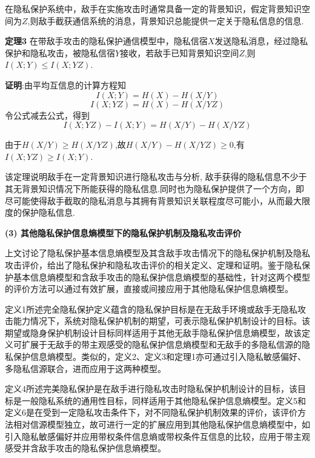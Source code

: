在隐私保护系统中，敌手在实施攻击时通常具备一定的背景知识，假定背景知识空间为$Z$,则敌手截获通信系统的消息，背景知识总能提供一定关于隐私信息的信息.

\textbf{定理3} 在带敌手攻击的隐私保护通信模型中，隐私信宿$X$发送隐私消息，经过隐私保护和隐私攻击，被隐私信宿$Y$接收，若敌手已知背景知识空间$Z$,则$I(X;Y)\leqslant I(X;YZ)$.

\textbf{证明}:由平均互信息的计算方程知
\begin{equation}
I(X;Y) =H(X)-H(X/Y)
\end{equation}
\begin{equation}
I(X;YZ) =H(X)-H(X/YZ)
\end{equation}
令公式减去公式，得到
\begin{equation}
I(X;YZ)-I(X;Y) =H(X/Y)-H(X/YZ)
\end{equation}

由于$H(X/Y) \geqslant H(X/YZ)$,故$H(X/Y)- H(X/YZ)\geqslant0$,有$I(X;YZ)\geqslant I(X;Y)$.

该定理说明敌手在一定背景知识进行隐私攻击与分析, 敌手获得的隐私信息不少于其无背景知识情况下所能获得的隐私信息.同时也为隐私保护提供了一个方向，即尽可能使得敌手截取的隐私消息与其拥有背景知识关联程度尽可能小，从而最大限度的保护隐私信息.

\textbf{(3) 其他隐私保护信息熵模型下的隐私保护机制及隐私攻击评价}

上文讨论了隐私保护基本信息熵模型及其含敌手攻击情况下的隐私保护机制及隐私攻击评价，给出了隐私保护和隐私攻击评价的相关定义、定理和证明。鉴于隐私保护基本信息熵模型和含敌手攻击的隐私保护信息熵模型的基础性，针对这两个模型的评价方法可以通过有效扩展，直接或间接应用于其他隐私保护信息熵模型。

定义1所述完全隐私保护定义蕴含的隐私保护目标是在无敌手环境或敌手无隐私攻击能力情况下，系统对隐私保护机制的期望，可表示隐私保护机制设计的目标。该期望或隐身保护机制设计目标同样适用于其他无敌手隐私保护信息熵模型，故该定义可扩展于无敌手的带主观感受的隐私保护信息熵模型和无敌手的多隐私信源的隐私保护信息熵模型。类似的，定义2、定义3和定理1亦可通过引入隐私敏感偏好、多隐私信源联合，进而应用于这两种模型。

定义4所述完美隐私保护是在敌手进行隐私攻击时隐私保护机制设计的目标，该目标是一般隐私系统的通用性目标，同样适用于其他隐私保护信息熵模型。定义5和定义6是在受到一定隐私攻击条件下，对不同隐私保护机制效果的评价，该评价方法相对信源模型独立，故可进行一定的扩展应用到其他隐私保护信息熵模型中，如引入隐私敏感偏好并应用带权条件信息熵或带权条件互信息的比较，应用于带主观感受并含敌手攻击的隐私保护信息熵模型。

